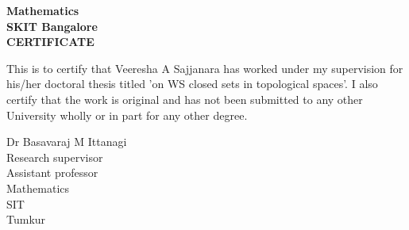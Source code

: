 \begin{center}
\bfseries
\large{Mathematics \\
SKIT
Bangalore} \\
\vspace{1.5in}
\LARGE{CERTIFICATE} \\
\end{center}
\vspace{0.5in}
\normalsize{
This is to certify that Veeresha A Sajjanara has worked under my supervision for his/her doctoral thesis titled 'on WS closed sets in topological spaces'. I also certify that the work is original and has not been submitted to any other University wholly or in part for any other degree.} \\
\vspace{0.5in}
\begin{flushleft}
\normalsize{Dr Basavaraj M Ittanagi} \\
Research supervisor\\
 Assistant professor\\
Mathematics  \\
SIT \\
Tumkur \\
\end{flushleft}


